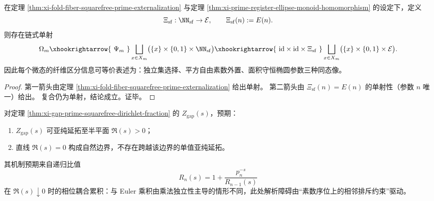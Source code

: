\begin{corollary}\label{cor:xi-fold-loss-prime-ellipse-triple-correspondence}
在定理 \ref{thm:xi-fold-fiber-squarefree-prime-externalization} 与定理 \ref{thm:xi-prime-register-ellipse-monoid-homomorphism} 的设定下，定义
\[
\Xi_{\mathrm{sf}}:\NN_{\mathrm{sf}}\to\mathcal E,\qquad \Xi_{\mathrm{sf}}(n):=E(n).
\]
则存在链式单射
\[
\Omega_m
\xhookrightarrow{\ \Psi_m\ }
\bigsqcup_{x\in X_m}\bigl(\{x\}\times\{0,1\}\times\NN_{\mathrm{sf}}\bigr)
\xhookrightarrow{\ \mathrm{id}\times\mathrm{id}\times\Xi_{\mathrm{sf}}\ }
\bigsqcup_{x\in X_m}\bigl(\{x\}\times\{0,1\}\times\mathcal E\bigr).
\]
因此每个微态的纤维区分信息可等价表述为：独立集选择、平方自由素数外置、面积守恒椭圆参数三种同态像。
\end{corollary}
\begin{proof}
第一箭头由定理 \ref{thm:xi-fold-fiber-squarefree-prime-externalization} 给出单射。
第二箭头由 \(\Xi_{\mathrm{sf}}(n)=E(n)\) 的单射性（参数 \(n\) 唯一）给出。
复合仍为单射，结论成立。证毕。
\end{proof}

\begin{conjecture}\label{conj:xi-gap-prime-dirichlet-natural-boundary}
对定理 \ref{thm:xi-gap-prime-squarefree-dirichlet-fraction} 的
\(
Z_{\mathrm{gap}}(s)
\)，预期：
\begin{enumerate}
  \item \(Z_{\mathrm{gap}}(s)\) 可亚纯延拓至半平面 \(\Re(s)>0\)；
  \item 直线 \(\Re(s)=0\) 构成自然边界，不存在跨越该边界的单值亚纯延拓。
\end{enumerate}
其机制预期来自递归比值
\[
R_n(s)=1+\frac{p_n^{-s}}{R_{n-1}(s)}
\]
在 \(\Re(s)\downarrow 0\) 时的相位耦合累积：与 Euler 乘积由乘法独立性主导的情形不同，此处解析障碍由“素数序位上的相邻排斥约束”驱动。
\end{conjecture}

